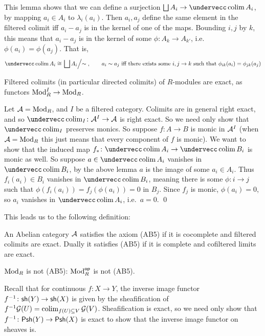 \eproof

This lemma shows that we can define a surjection $\bigsqcup A_i\to\coflim A_i$, by mapping $a_i\in A_i$ to $\lambda_i(a_i)$.
Then $a_i,a_j$ define the same element in the filtered colimit iff $a_i-a_j$ is in the kernel of one of the maps.
Bounding $i,j$ by $k$, this means that $a_i-a_j$ is in the kernel of some $\phi\colon A_k\to A_{k'}$, i.e.\ $\phi(a_i)=\phi(a_j)$.
That is,
$$ \coflim A_i \cong \left.\bigsqcup A_i\middle/\sim\right.,\qquad a_i\sim a_j\hbox{ iff there exists some $i,j\to k$ such that $\phi_{ik}(a_i)=\phi_{jk}(a_j)$} $$

\bthrm

    Filtered colimits (in particular directed colimits) of $R$-modules are exact, as functors ${\rm Mod}_R^I\to{\rm Mod}_R$.

\ethrm

\bproof

    Let ${{\cal A}}={\rm Mod}_R$, and $I$ be a filtered category.
    Colimits are in general right exact, and so $\coflim_I\colon\A^I\to\A$ is right exact.
    So we need only show that $\coflim_I$ preserves monics.
    So suppose $f\colon A\to B$ is monic in ${{\cal A}}^I$ (when ${{\cal A}}={\rm Mod}_R$ this just means that every component of $f$ is monic).
    We want to show that the induced map $f_*\colon\coflim A_i\to\coflim B_i$ is monic as well.
    So suppose $a\in\coflim A_i$ vanishes in $\coflim B_i$, by the above lemma $a$ is the image of some $a_i\in A_i$.
    Thus $f_i(a_i)\in B_i$ vanishes in $\coflim B_i$, meaning there is some $\phi\colon i\to j$ such that $\phi(f_i(a_i))=f_j(\phi(a_i))=0$ in $B_j$.
    Since $f_j$ is monic, $\phi(a_i)=0$, so $a_i$ vanishes in $\coflim A_i$, i.e.\ $a=0$.
    \qed

\eproof

This leads us to the following definition:

\bdefn

    An Abelian category ${{\cal A}}$ satisfies the axiom {\emphcolor (AB5)} if it is cocomplete and filtered colimits are exact.
    Dually it satisfies {\emphcolor (AB5\star)} if it is complete and cofiltered limits are exact.

\edefn

${\rm Mod}_R$ is not (AB5\star): ${\rm Mod}_R^{\sf op}$ is not (AB5).

\bexam

    Recall that for continuous $f\colon X\to Y$, the inverse image functor $f^{-1}\colon{\sf sh}(Y)\to{\sf sh}(X)$ is given by the sheafification of
    $f^{-1}{{\cal G}}(U)=\mathop{\rm colim}\nolimits_{f(U)\subseteq V}{{\cal G}}(V)$.
    Sheafification is exact, so we need only show that $f^{-1}\colon{\sf Psh}(Y)\to{\sf Psh}(X)$ is exact to show that the inverse image functor on sheaves is.

